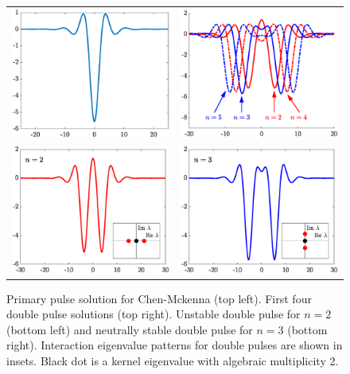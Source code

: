 \documentclass[12pt,reqno,oneside]{article}
\begin{document}
\begin{figure}
    \centering
    \begin{tabular}{cc}
        \includegraphics[width=7cm]{images/chen1p.eps} &
        \includegraphics[width=7cm]{images/chenDPall.eps} \\
        \includegraphics[width=7cm]{images/chen2punstable.eps} &
        \includegraphics[width=7cm]{images/chen2pstable.eps} 
    \end{tabular}
    \caption{Primary pulse solution for Chen-Mckenna (top left). First four double pulse solutions (top right). Unstable double pulse for $n=2$ (bottom left) and neutrally stable double pulse for $n=3$ (bottom right). Interaction eigenvalue patterns for double pulses are shown in insets. Black dot is a kernel eigenvalue with algebraic multiplicity 2.}
    \label{fig:chen2p}
\end{figure}
\end{document}
